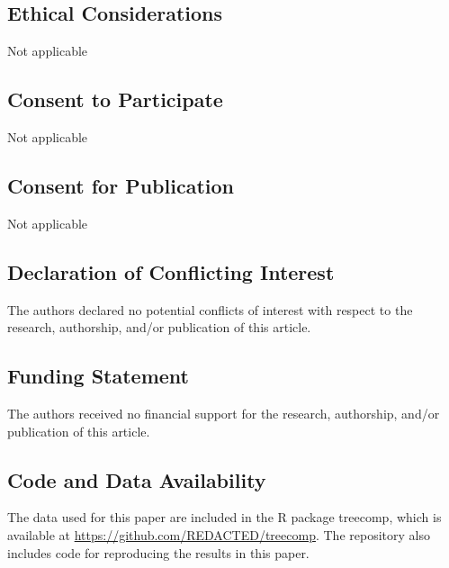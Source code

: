 \documentclass[Review, sageh, times, doublespace]{sagej}
\begin{document}
\subsection{Ethical Considerations}

Not applicable

\subsection{Consent to Participate}

Not applicable

\subsection{Consent for Publication}

Not applicable

\subsection{Declaration of Conflicting Interest}

The authors declared no potential conflicts of interest with respect to the research, authorship, and/or publication of this article.

\subsection{Funding Statement}

The authors received no financial support for the research, authorship, and/or publication of this article.

\subsection{Code and Data Availability}

The data used for this paper are included in the R package treecomp, which is available at \url{https://github.com/REDACTED/treecomp}. The repository also includes code for reproducing the results in this paper.



\end{document}
